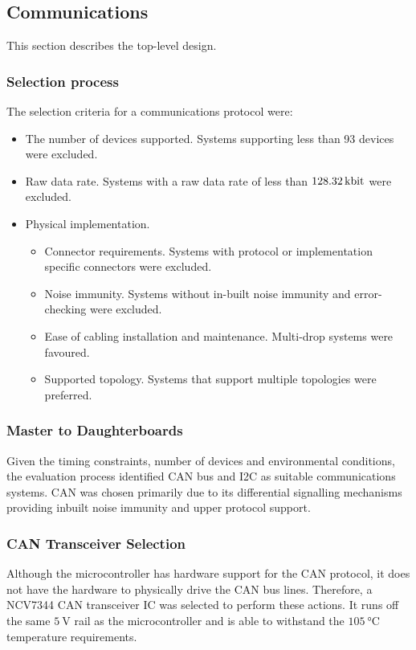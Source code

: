 \subsection{Communications}
\label{sec:communications}

This section describes the top-level design.%

\subsubsection{Selection process}
The selection criteria for a communications protocol were:
\begin{itemize}
	\item The number of devices supported. Systems supporting less than 93 devices were excluded.
	\item Raw data rate. Systems with a raw data rate of less than $\SI{128.32}{\kilo\bit}$ were excluded.
	\item Physical implementation. 
	\begin{itemize}
		\item Connector requirements. Systems with protocol or implementation specific connectors were excluded.
		\item Noise immunity. Systems without in-built noise immunity and error-checking were excluded.
		\item Ease of cabling installation and maintenance. Multi-drop systems were favoured.
		\item Supported topology. Systems that support multiple topologies were preferred.
	\end{itemize}
\end{itemize}

\subsubsection{Master to Daughterboards} 
Given the timing constraints, number of devices and environmental conditions, the evaluation process identified CAN bus and I2C as suitable communications systems.
CAN was chosen primarily due to its differential signalling mechanisms providing inbuilt noise immunity and upper protocol support. 

\subsubsection{CAN Transceiver Selection}
Although the microcontroller has hardware support for the CAN protocol, it does not have the hardware to physically drive the CAN bus lines.
Therefore, a NCV7344 CAN transceiver IC was selected to perform these actions.
It runs off the same $\SI{5}{\volt}$ rail as the microcontroller and is able to withstand the $\SI{105}{\degreeCelsius}$ temperature requirements.

